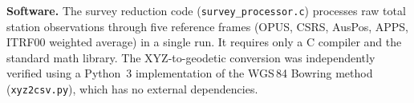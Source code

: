 \documentclass[11pt,letterpaper]{article}
\begin{document}
{\vspace{0.3cm}

\noindent\textbf{Software.} The survey reduction code (\texttt{survey\_processor.c}) processes raw total station observations through five reference frames (OPUS, CSRS, AusPos, APPS, ITRF00 weighted average) in a single run. It requires only a C compiler and the standard math library. The XYZ-to-geodetic conversion was independently verified using a Python~3 implementation of the WGS\,84 Bowring method (\texttt{xyz2csv.py}), which has no external dependencies.
}


\end{document}
